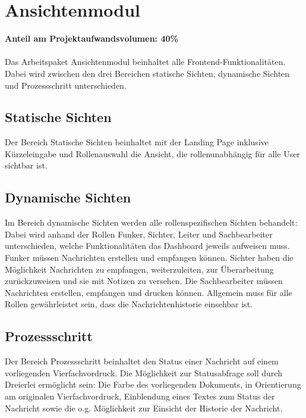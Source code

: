 \section{Ansichtenmodul} 
\textbf{Anteil am Projektaufwandsvolumen: 40\%} \\ \\
Das Arbeitspaket Ansichtenmodul beinhaltet alle Frontend-Funktionalitäten. 
Dabei wird zwischen den drei Bereichen statische Sichten, dynamische Sichten 
und Prozessschritt unterschieden. 
\subsection{Statische Sichten}
Der Bereich Statische Sichten beinhaltet mit der Landing Page inklusive 
Kürzeleingabe und Rollenauswahl die Ansicht, die rollenunabhängig für 
alle User sichtbar ist. 
\subsection{Dynamische Sichten}
Im Bereich dynamische Sichten werden alle rollenspezifischen Sichten 
behandelt: Dabei wird anhand der Rollen Funker, Sichter, Leiter und 
Sachbearbeiter unterschieden, welche Funktionalitäten das Dashboard jeweils 
aufweisen muss. Funker müssen Nachrichten erstellen und empfangen können.
Sichter haben die Möglichkeit Nachrichten zu empfangen, weiterzuleiten, zur 
Überarbeitung zurückzuweisen und sie mit Notizen zu versehen. Die Sachbearbeiter 
müssen Nachrichten erstellen, empfangen und drucken können. 
Allgemein muss für alle Rollen gewährleistet sein, dass die 
Nachrichtenhistorie einsehbar ist. 
\subsection{Prozessschritt}
Der Bereich Prozessschritt beinhaltet den Status einer Nachricht 
auf einem vorliegenden Vierfachvordruck. Die Möglichkeit zur Statusabfrage 
soll durch Dreierlei ermöglicht sein: Die Farbe des vorliegenden Dokuments, 
in Orientierung am originalen Vierfachvordruck, Einblendung eines 
Textes zum Status der Nachricht sowie die o.g. Möglichkeit zur Einsicht der 
Historie der Nachricht.
